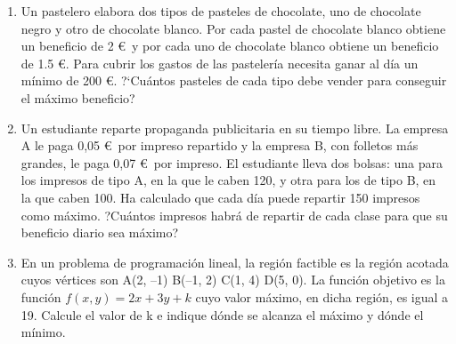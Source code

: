 \begin{adjustwidth}{20pt}{10pt}
\begin{enumerate}[PB. 1. ]
\hspace{-15mm}

\hspace{-15mm}\vspace{1cm}




\item Un pastelero elabora dos tipos de pasteles de chocolate, uno de chocolate negro y otro de chocolate blanco. Por cada pastel de chocolate blanco obtiene un beneficio de 2 \euro $\,$ y por cada uno de chocolate blanco obtiene un beneficio de 1.5 \euro. Para cubrir los gastos de las pastelería necesita ganar al día un mínimo de 200 \euro. ?`Cuántos pasteles de cada tipo debe vender para conseguir el máximo beneficio?

\hspace{-15mm}\vspace{1cm}



\item Un estudiante reparte propaganda publicitaria en su tiempo libre. La empresa A le paga 0,05 \euro $\,$ por impreso repartido y la empresa B, con folletos más grandes, le paga 0,07 \euro $\,$ por impreso. El estudiante lleva dos bolsas: una para los impresos de tipo A, en la que le caben 120, y otra para los de tipo B, en la que caben 100. Ha calculado que cada día puede repartir 150 impresos como máximo. ?Cuántos impresos habrá de repartir de cada clase para que su beneficio diario sea máximo?

\hspace{-15mm}\vspace{1cm}




\item En un problema de programación lineal, la región factible es la región acotada cuyos vértices son A(2, –1) B(–1, 2) C(1, 4) D(5, 0). La función objetivo es la función $f(x, y) = 2x + 3y + k$ cuyo valor máximo, en dicha región, es igual a 19. Calcule el valor de k e indique dónde se alcanza el máximo y dónde el mínimo.


\end{enumerate}
\end{adjustwidth}

